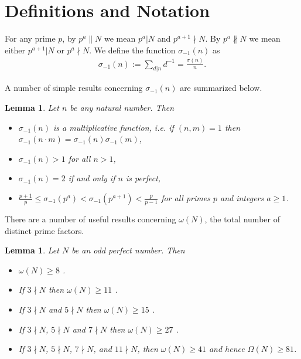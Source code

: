\documentclass{article}
\newtheorem{lem}[thm]{Lemma}
\newcommand{\sii} {\sigma_{-1}}
\begin{document}
%
    
\section{Definitions and Notation}

For any prime $p$, by $p^a\parallel N$ we mean $p^a |N$ and $p^{a+1}\nmid N$.
By $p^a\nparallel N$ we mean either $p^{a+1}| N$ or $p^a \nmid N$.
We define the function $\sii(n)$ as 
\begin{eqnarray}
\sii(n) := \sum_{d|n}d^{-1} = \frac{\sigma(n)}{n}.
\label{eq:sii}
\end{eqnarray}

A number of simple results concerning $\sii(n)$ are summarized below.
\begin{lem}
\label{lem:sii}
Let $n$ be any natural number.
Then 
\begin{itemize}
\item $\sii(n)$ is a multiplicative function,  
    i.e. if $(n, m) = 1$ then $\sii(n\cdot m) = \sii(n) \sii(m)$,
\item $\sii(n) > 1$ for all $n > 1$,
\item $\sii(n) = 2$ if and only if $n$ is perfect,
\item $\frac{p+1}{p} \leq \sii(p^a) < \sii(p^{a+1}) < \frac{p}{p-1}$
    for all primes $p$ and integers $a \geq 1$.
\end{itemize}
\end{lem}

There are a number of useful results concerning $\omega(N)$, the total number
    of distinct prime factors.
\begin{lem}
\label{lem:exclude}
Let $N$ be an odd perfect number.
Then
\begin{itemize}
\item $\omega(N) \geq 8$ \cite{Chein79, Hagis80}.
\item If $3 \nmid N$ then $\omega(N) \geq 11$ \cite{Hagis83, Kishore83}.
\item If $3 \nmid N$ and $5 \nmid N$ then $\omega(N) \geq 15$ \cite{Norton61}.
\item If $3 \nmid N$, $5 \nmid N$ and $7 \nmid N$ then
    $\omega(N) \geq 27$ \cite{Norton61}.
\item If $3 \nmid N$, $5 \nmid N$, $7 \nmid N$, and $11 \nmid N$, 
    then $\omega(N) \geq 41$ and hence $\Omega(N) \geq 81$.
\end{itemize}
\end{lem}
\end{document}
